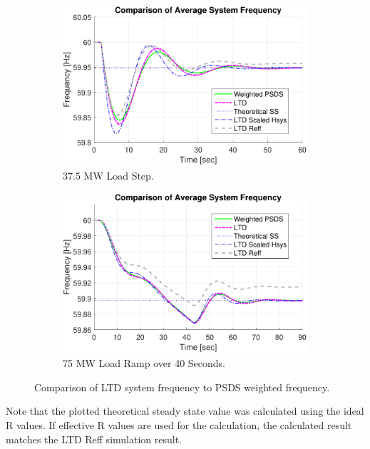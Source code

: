 \documentclass[12pt]{article}
\begin{document}
\begin{figure}[h!]
	\centering
	\begin{subfigure}{.48\linewidth}
		\centering
		\includegraphics[width=\figW\linewidth]{HReffCompStep}\vspace{-.5em}
		\caption{37.5 MW Load Step.}
		\label{fig:sfig1}
	\end{subfigure}\hspace{1em}%
	\begin{subfigure}{.48\linewidth}
		\centering
		\includegraphics[width=\figW\linewidth]{HReffCompRamp}\vspace{-.5em}
		\caption{75 MW Load Ramp over 40 Seconds.}
		\label{fig:sfig2}
	\end{subfigure}
	\caption{Comparison of LTD system frequency to PSDS weighted frequency.}
	\label{fig:featureComp}		 
\end{figure}%

Note that the plotted theoretical steady state value was calculated using the ideal R values. If effective R values are used for the calculation, the calculated result matches the LTD Reff simulation result.
\end{document}
